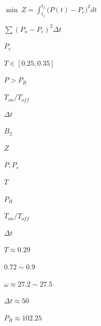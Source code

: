 
$\min\ Z=\int_{t_1}^{t_2}\big(P(t)-P_e\big)^2 dt$

$\sum(P_n-P_e)^2\Delta t$

$P_e$

$T\in[0.25,0.35]$

$P>P_R$

$T_{on}/T_{off}$

$\Delta t$

$B_2$

$Z$

$P,P_e$

$T$

$P_R$

$T_{on}/T_{off}$

$\Delta t$

$T\approx0.29$

$0.72\sim0.9$

$\omega\approx27.2\sim27.5$

$\Delta t\approx50$

$P_R\approx102.25$
